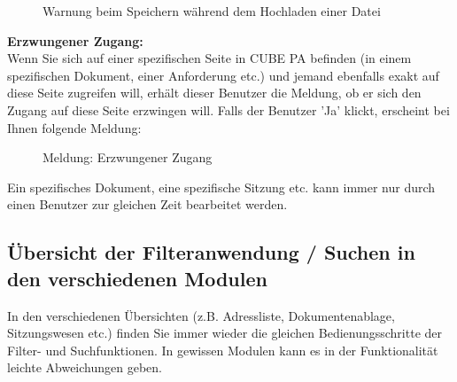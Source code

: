 \begin{figure}[H]
\caption{Warnung beim Speichern während dem Hochladen einer Datei}
\end{figure}

\textbf{Erzwungener Zugang:}\\
Wenn Sie sich auf einer spezifischen Seite in CUBE PA befinden (in einem spezifischen Dokument, einer Anforderung etc.) und jemand ebenfalls exakt auf diese Seite zugreifen will, erhält dieser Benutzer die Meldung, ob er sich den Zugang auf diese Seite erzwingen will. Falls der Benutzer 'Ja' klickt, erscheint bei Ihnen folgende Meldung: 

\begin{figure}[H]
\caption{Meldung: Erzwungener Zugang}
\end{figure}

Ein spezifisches Dokument, eine spezifische Sitzung etc. kann immer nur durch einen Benutzer zur gleichen Zeit bearbeitet werden.

\pagebreak
\subsection{Übersicht der Filteranwendung / Suchen in den verschiedenen Modulen}

In den verschiedenen Übersichten (z.B. Adressliste, Dokumentenablage, Sitzungswesen etc.) finden Sie immer wieder die gleichen Bedienungsschritte der Filter- und Suchfunktionen. In gewissen Modulen kann es in der Funktionalität leichte Abweichungen geben. 

\vspace{\baselineskip}

